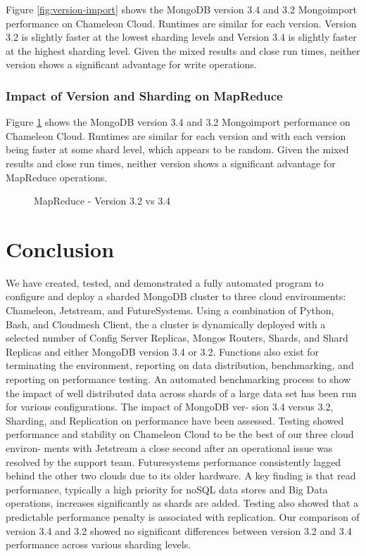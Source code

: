 \documentclass[sigconf]{acmart}
\begin{document}
Figure \ref{fig:version-import} shows the MongoDB version 3.4 and 3.2
Mongoimport performance on Chameleon Cloud. Runtimes are similar for
each version.  Version 3.2 is slightly faster at the lowest sharding
levels and Version 3.4 is slightly faster at the highest sharding
level.  Given the mixed results and close run times, neither version
shows a significant advantage for write operations.


\subsubsection{Impact of Version and Sharding on MapReduce}

Figure \ref{fig:version-mapreduce} shows the MongoDB version 3.4 and
3.2 Mongoimport performance on Chameleon Cloud.  Runtimes are similar
for each version and with each version being faster at some shard
level, which appears to be random. Given the mixed results and close
run times, neither version shows a significant advantage for MapReduce
operations.

\begin{figure}[htbp]
\centering
{}
\caption{MapReduce - Version 3.2 vs 3.4}
\label{fig:version-mapreduce}
\end{figure}

\section{Conclusion}

We have created, tested, and demonstrated a fully automated program to
configure and deploy a sharded MongoDB cluster to three cloud
environments: Chameleon, Jetstream, and FutureSystems. Using a
combination of Python, Bash, and Cloudmesh Client, the a cluster is
dynamically deployed with a selected number of Config Server Replicas,
Mongos Routers, Shards, and Shard Replicas and either MongoDB version
3.4 or 3.2. Functions also exist for terminating the environment,
reporting on data distribution, benchmarking, and reporting on
performance testing.  An automated benchmarking process to show the
impact of well distributed data across shards of a large data set has
been run for various configurations. The impact of MongoDB ver- sion
3.4 versus 3.2, Sharding, and Replication on performance have been
assessed. Testing showed performance and stability on Chameleon Cloud
to be the best of our three cloud environ- ments with Jetstream a
close second after an operational issue was resolved by the support
team. Futuresystems performance consistently lagged behind the other
two clouds due to its older hardware. A key finding is that read
performance, typically a high priority for noSQL data stores and Big
Data operations, increases significantly as shards are added. Testing
also showed that a predictable performance penalty is associated with
replication. Our comparison of version 3.4 and 3.2 showed no
significant differences between version 3.2 and 3.4 performance across
various sharding levels.




 
\end{document}
